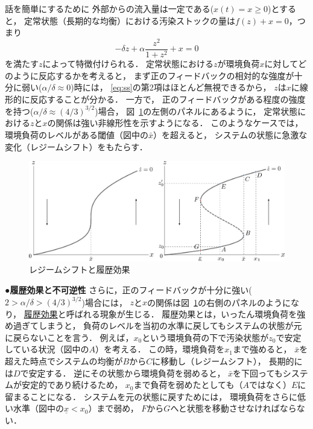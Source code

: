 \documentclass[11pt,a4paper]{article}
\renewcommand{\figurename}{図}
\begin{document}
話を簡単にするために
外部からの流入量は一定である($x(t)=x\geq 0$)とすると，
定常状態（長期的な均衡）における汚染ストックの量は$f(z)+x = 0$，つまり
\begin{equation}\label{eq:ss}%
  -\delta z + \alpha\frac{z^{2}}{1+z^{2}} + x = 0
\end{equation}
を満たす$z$によって特徴付けられる．
定常状態における$z$が環境負荷$x$に対してどのように反応するかを考えると，
まず正のフィードバックの相対的な強度が十分に弱い($\alpha/\delta\approx 0$)時には，
\eqref{eq:ss}の第2項はほとんど無視できるから，
$z$は$x$に線形的に反応することが分かる．
一方で，
正のフィードバックがある程度の強度を持つ($\alpha/\delta\approx (4/3)^{3/2}$)場合，
\figurename~\ref{fig:nonconvex_lake}の左側のパネルにあるように， 
定常状態における$z$と$x$の関係は強い非線形性を示すようになる．
このようなケースでは，環境負荷のレベルがある閾値（図中の$\bar{x}$）を超えると，
システムの状態に急激な変化（レジームシフト）をもたらす．
%
\begin{figure}[t]\centering%
  \includegraphics[width=380pt]{figures/fig_nonconvex_lake_b.eps}
\caption{レジームシフトと履歴効果}
\label{fig:nonconvex_lake}
\end{figure}

\noindent\textbf{●履歴効果と不可逆性}\hspace{0.5em}
さらに，正のフィードバックが十分に強い($2>\alpha/\delta> (4/3)^{3/2}$)場合には， 
$z$と$x$の関係は\figurename~\ref{fig:nonconvex_lake}の右側のパネルのようになり，
\underline{履歴効果}と呼ばれる現象が生じる．
履歴効果とは，いったん環境負荷を強め過ぎてしまうと，
負荷のレベルを当初の水準に戻してもシステムの状態が元に戻らないことを言う．
例えば，$x_{0}$という環境負荷の下で汚染状態が$z_{0}$で安定している状況（図中の$A$）を考える．
この時，環境負荷を$x_{1}$まで強めると，
$\bar{x}$を超えた時点でシステムの均衡が$B$から$C$に移動し（レジームシフト），
長期的には$D$で安定する．
逆にその状態から環境負荷を弱めると，
$\bar{x}$を下回ってもシステムが安定的であり続けるため，
$x_{0}$まで負荷を弱めたとしても（$A$ではなく）$E$に留まることになる．
システムを元の状態に戻すためには，
環境負荷をさらに低い水準（図中の$\underline{x}<x_{0}$）まで弱め，
$F$から$G$へと状態を移動させなければならない．
\end{document}

